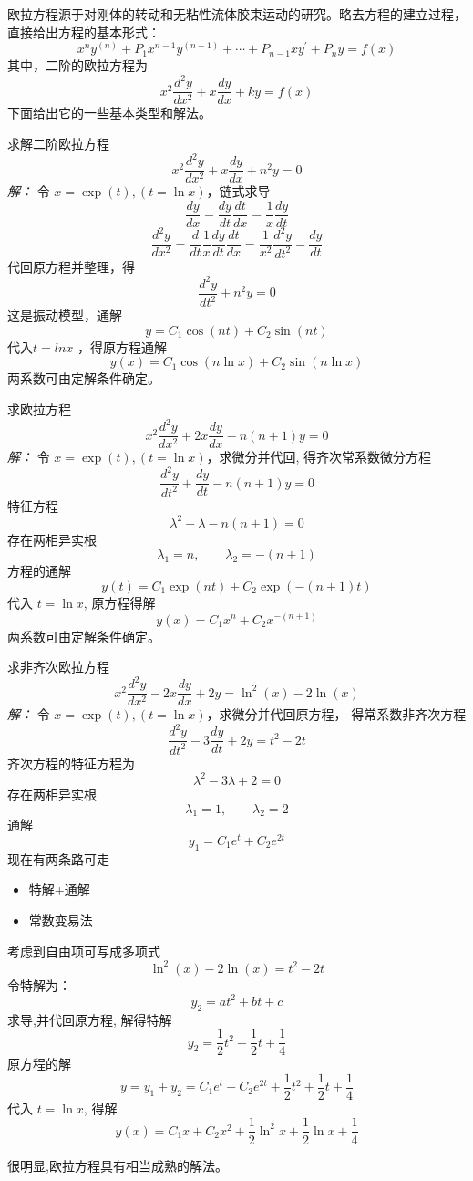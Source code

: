 欧拉方程源于对刚体的转动和无粘性流体胶束运动的研究。略去方程的建立过程，直接给出方程的基本形式：
\begin{equation}
x^n y^{(n)}+P_1 x^{n-1} y^{(n-1)}+\cdots+P_{n-1} x y^{\prime}+P_n y=f(x)
\end{equation}
其中，二阶的欧拉方程为
\begin{equation}
	x^2 \frac{d^2 y}{d x^2} +x \frac{d y}{d x} +k y =f(x) 
\end{equation}
下面给出它的一些基本类型和解法。
\begin{example} 
	求解二阶欧拉方程
\begin{equation}
	x^2 \frac{d^2 y}{d x^2} +x \frac{d y}{d x} +n^2 y =0 
\end{equation}
\emph{解：}
令 $x=\exp(t) , (t=\ln x)$，链式求导
$$ 
\frac{d y}{d x}  = \frac{d y}{d t}\frac{d t}{d x}= \frac{1}{ x}\frac{d y}{d t} 
$$ 
$$ \frac{d^2y}{dx^2} =\frac{d}{dt} \frac{1}{x}\frac{dy}{dt}\frac{dt}{dx}= \frac{1}{x^2}\frac{d^2y}{dt^2}-\frac{dy}{dt} $$ 
代回原方程并整理，得
$$ \frac{d^2 y}{d t^2}  +n^2 y =0  $$
这是振动模型，通解 
$$ y=C_1 \cos(n t)+C_2 \sin(n t) $$
代入$t=ln x$ ，得原方程通解
$$ y(x)=C_1 \cos (n \ln x) +C_2 \sin (n \ln x)  $$ 
两系数可由定解条件确定。
\end{example}
\begin{example} 
	求欧拉方程
\begin{equation}
	x^2 \frac{d^2 y}{d x^2} +2x \frac{d y}{d x} -n(n+1) y =0 
\end{equation}
\emph{解：}
	令 $x=\exp(t) , (t=\ln x)$，求微分并代回, 得齐次常系数微分方程
	$$ \frac{d^2 y}{d t^2}  +\frac{dy}{dt}-n(n+1) y =0 $$ 
	特征方程
	$$ \lambda^2 +\lambda -n(n+1) =0 $$
	存在两相异实根 $$ \lambda_1=n, \qquad \lambda_2= -(n+1) $$
	方程的通解
$$ y(t)=C_1 \exp (nt) +C_2 \exp (-(n+1) t)  $$
代入 $t=\ln x$, 原方程得解
$$ y(x)=C_1 x^n +C_2 x^{-(n+1) } $$
两系数可由定解条件确定。
\end{example}
\begin{example} 
	求非齐次欧拉方程
\begin{equation}
	x^2 \frac{d^2 y}{d x^2} -2x \frac{d y}{d x} +2y = \ln^2( x) -2 \ln(x) 
\end{equation}
\emph{解：} 
	令 $x=\exp(t) , (t=\ln x)$，求微分并代回原方程， 得常系数非齐次方程
	$$ 
\frac{d^2 y}{d t^2}  -3\frac{dy}{dt} +2 y =t^2 -2t  $$
齐次方程的特征方程为
$$ \lambda^2  -3\lambda +2  =0  $$
存在两相异实根
$$ \lambda_1=1, \qquad \lambda_2=2 $$
通解
$$y_1=C_1 e^t +C_2 e^{2t}$$
现在有两条路可走 
\begin{itemize}
	\item 特解+通解
	\item 常数变易法
\end{itemize}
考虑到自由项可写成多项式
$$ \ln^2( x) -2 \ln(x) = t^{2} -2 t $$
令特解为：
$$y_2=a t^2+bt+c$$
求导,并代回原方程, 解得特解
$$ y_2=\frac{1}{2} t^2+\frac{1}{2}t+\frac{1}{4}  $$
原方程的解
$$ y= y_1 + y_2 =C_1 e^t +C_2 e^{2t}+\frac{1}{2} t^2+\frac{1}{2}t+\frac{1}{4}  $$
代入 $t=\ln x $, 得解 
$$ y(x)=C_1 x +C_2 x^2+\frac{1}{2} \ln ^2 x+\frac{1}{2}\ln x+\frac{1}{4} $$

\end{example}
很明显,欧拉方程具有相当成熟的解法。

